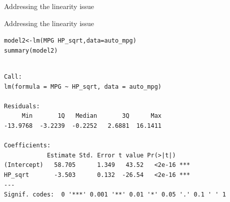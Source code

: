 \documentclass{beamer}\usepackage[]{graphicx}\usepackage[]{color}
\makeatletter
\newcommand{\hlstr}[1]{\textcolor[rgb]{1,0.894,0.71}{#1}}%
\newcommand{\hlopt}[1]{\textcolor[rgb]{1,0.894,0.769}{#1}}%
\newcommand{\hlstd}[1]{\textcolor[rgb]{1,0.894,0.769}{#1}}%
\newcommand{\hlkwb}[1]{\textcolor[rgb]{0.804,0.776,0.451}{#1}}%
\newcommand{\hlkwc}[1]{\textcolor[rgb]{0.78,0.941,0.545}{#1}}%
\newcommand{\hlkwd}[1]{\textcolor[rgb]{1,0.78,0.769}{#1}}%
\newenvironment{kframe}{%
 \def\at@end@of@kframe{}%
 \ifinner\ifhmode%
  \def\at@end@of@kframe{\end{minipage}}%
  \begin{minipage}{\columnwidth}%
 \fi\fi%
 \def\FrameCommand##1{\hskip\@totalleftmargin \hskip-\fboxsep
 \colorbox{shadecolor}{##1}\hskip-\fboxsep
     \hskip-\linewidth \hskip-\@totalleftmargin \hskip\columnwidth}%
 \MakeFramed {\advance\hsize-\width
   \@totalleftmargin\z@ \linewidth\hsize
   \@setminipage}}%
 {\par\unskip\endMakeFramed%
 \at@end@of@kframe}
\newenvironment{knitrout}{}{} %
\makeatother
\begin{document}
\begin{darkframes}
\begin{frame}[fragile]{Addressing the linearity issue}
\begin{knitrout}
\end{knitrout}
     \end{frame}  
    
    
      
    
    
    
  
  
  
    \begin{frame}[fragile]{Addressing the linearity issue}
      \fontsize{9}{9}\selectfont
\begin{knitrout}
\begin{kframe}
\begin{alltt}
  \hlstd{model2}\hlkwb{<-}\hlkwd{lm}\hlstd{(MPG} \hlopt{~} \hlstd{HP_sqrt,} \hlkwc{data}\hlstd{=auto_mpg)}
  \hlkwd{summary}\hlstd{(model2)}
\end{alltt}
\begin{verbatim}

Call:
lm(formula = MPG ~ HP_sqrt, data = auto_mpg)

Residuals:
     Min       1Q   Median       3Q      Max 
-13.9768  -3.2239  -0.2252   2.6881  16.1411 

Coefficients:
            Estimate Std. Error t value Pr(>|t|)    
(Intercept)   58.705      1.349   43.52   <2e-16 ***
HP_sqrt       -3.503      0.132  -26.54   <2e-16 ***
---
Signif. codes:  0 '***' 0.001 '**' 0.01 '*' 0.05 '.' 0.1 ' ' 1


\end{verbatim}
\end{kframe}
\end{knitrout}
\end{frame}
\end{darkframes}
\end{document}
